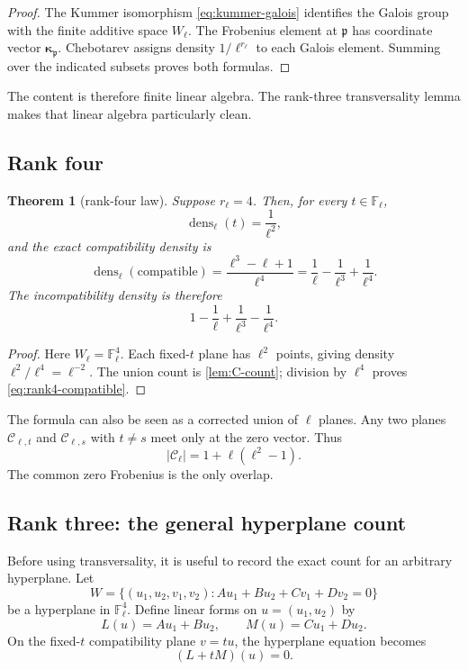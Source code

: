 \documentclass[11pt,oneside]{article}
\newtheorem{theorem}{Theorem}[section]
\theoremstyle{definition}
\theoremstyle{remark}
\newcommand{\F}{\mathbb{F}}
\newcommand{\dens}{\operatorname{dens}}
\begin{document}
\begin{proof}
The Kummer isomorphism \eqref{eq:kummer-galois} identifies the Galois group
with the finite additive space $W_\ell$.  The Frobenius element at
$\mathfrak p$ has coordinate vector
$\boldsymbol\kappa_{\mathfrak p}$.  Chebotarev assigns density
$1/\ell^{r_\ell}$ to each Galois element.  Summing over the indicated subsets
proves both formulas.
\end{proof}

The content is therefore finite linear algebra.  The rank-three
transversality lemma makes that linear algebra particularly clean.

\subsection{Rank four}

\begin{theorem}[rank-four law]\label{thm:rank4-law}
Suppose $r_\ell=4$.  Then, for every $t\in\F_\ell$,
\[
 \dens_\ell(t)=\frac1{\ell^2},
\]
and the exact compatibility density is
\begin{equation}\label{eq:rank4-compatible}
 \dens_\ell(\mathrm{compatible})
 =\frac{\ell^3-\ell+1}{\ell^4}
 =\frac1\ell-\frac1{\ell^3}+\frac1{\ell^4}.
\end{equation}
The incompatibility density is therefore
\begin{equation}\label{eq:rank4-incompatible}
 1-\frac1\ell+\frac1{\ell^3}-\frac1{\ell^4}.
\end{equation}
\end{theorem}

\begin{proof}
Here $W_\ell=\F_\ell^4$.  Each fixed-$t$ plane has $\ell^2$ points, giving
density $\ell^2/\ell^4=\ell^{-2}$.  The union count is
\cref{lem:C-count}; division by $\ell^4$ proves
\eqref{eq:rank4-compatible}.
\end{proof}

The formula can also be seen as a corrected union of $\ell$ planes.  Any two
planes $\mathcal C_{\ell,t}$ and $\mathcal C_{\ell,s}$ with $t\ne s$ meet
only at the zero vector.  Thus
\[
 |\mathcal C_\ell|=1+\ell(\ell^2-1).
\]
The common zero Frobenius is the only overlap.

\subsection{Rank three: the general hyperplane count}

Before using transversality, it is useful to record the exact count for an
arbitrary hyperplane.  Let
\begin{equation}\label{eq:hyperplane}
 W=\{(u_1,u_2,v_1,v_2):Au_1+Bu_2+Cv_1+Dv_2=0\}
\end{equation}
be a hyperplane in $\F_\ell^4$.  Define linear forms on
$u=(u_1,u_2)$ by
\[
 L(u)=Au_1+Bu_2,\qquad M(u)=Cu_1+Du_2.
\]
On the fixed-$t$ compatibility plane $v=tu$, the hyperplane equation becomes
\begin{equation}\label{eq:L+tM}
 (L+tM)(u)=0.
\end{equation}
\end{document}
